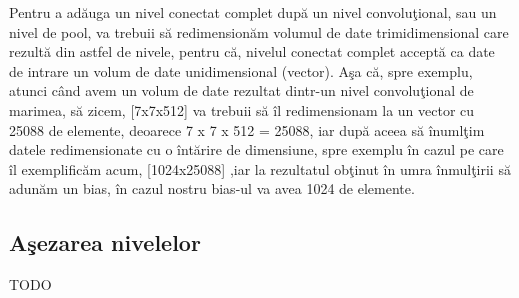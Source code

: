 Pentru a ad\u{a}uga un nivel conectat complet dup\u{a} un nivel convolu\c{t}ional, sau un nivel de pool, va trebuii s\u{a} redimension\u{a}m volumul de date trimidimensional care rezult\u{a} din astfel de nivele, pentru c\u{a}, nivelul conectat complet accept\u{a} ca date de intrare un volum de date unidimensional (vector). A\c{s}a c\u{a}, spre exemplu, atunci c\^{a}nd avem un volum de date rezultat dintr-un nivel convolu\c{t}ional de marimea, s\u{a} zicem, [7x7x512] va trebuii s\u{a} \^{i}l redimensionam la un vector cu 25088 de elemente, deoarece 7 x 7 x 512 = 25088, iar dup\u{a} aceea s\u{a} \^{i}numl\c{t}im datele redimensionate cu o \^{i}nt\u{a}rire de dimensiune, spre exemplu \^{i}n cazul pe care \^{i}l exemplific\u{a}m acum, [1024x25088] ,iar la rezultatul ob\c{t}inut \^{i}n umra \^{i}nmul\c{t}irii s\u{a} adun\u{a}m un bias, \^{i}n cazul nostru bias-ul  va avea 1024 de elemente.

\subsection{A\c{s}ezarea nivelelor}

TODO